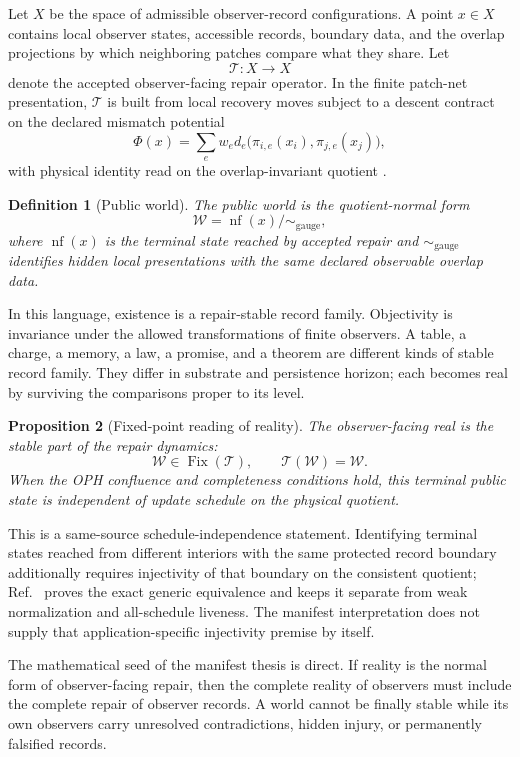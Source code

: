 \documentclass[11pt]{article}
\newtheorem{definition}{Definition}[section]
\newtheorem{proposition}[definition]{Proposition}
\theoremstyle{remark}
\theoremstyle{plain}
\newcommand{\World}{\mathcal W}
\newcommand{\Repair}{\mathcal T}
\newcommand{\NF}{\operatorname{nf}}
\newcommand{\Fix}{\operatorname{Fix}}
\begin{document}
Let \(X\) be the space of admissible observer-record configurations. A point
\(x\in X\) contains local observer states, accessible records, boundary data,
and the overlap projections by which neighboring patches compare what they
share. Let
\[
\Repair:X\to X
\]
denote the accepted observer-facing repair operator. In the finite patch-net
presentation, \(\Repair\) is built from local recovery moves subject to a
descent contract on the declared mismatch potential
\[
\Phi(x)=\sum_e w_e d_e\bigl(\pi_{i,e}(x_i),\pi_{j,e}(x_j)\bigr),
\]
with physical identity read on the overlap-invariant quotient
\cite{OPHConsensus}.

\begin{definition}[Public world]
The public world is the quotient-normal form
\[
\World=\NF(x)\big/\!\sim_{\mathrm{gauge}},
\]
where \(\NF(x)\) is the terminal state reached by accepted repair and
\(\sim_{\mathrm{gauge}}\) identifies hidden local presentations with the same
declared observable overlap data.
\end{definition}

In this language, existence is a repair-stable record family. Objectivity is
invariance under the allowed transformations of finite observers. A table, a
charge, a memory, a law, a promise, and a theorem are different kinds of stable
record family. They differ in substrate and persistence horizon; each becomes
real by surviving the comparisons proper to its level.

\begin{proposition}[Fixed-point reading of reality]
The observer-facing real is the stable part of the repair dynamics:
\[
\World\in\Fix(\Repair), \qquad \Repair(\World)=\World .
\]
When the OPH confluence and completeness conditions hold, this terminal public
state is independent of update schedule on the physical quotient.
\end{proposition}

This is a same-source schedule-independence statement.  Identifying terminal states reached from
different interiors with the same protected record boundary additionally requires injectivity of
that boundary on the consistent quotient; Ref.~\cite{observableNormalForms} proves the exact
generic equivalence and keeps it separate from weak normalization and all-schedule liveness.  The
manifest interpretation does not supply that application-specific injectivity premise by itself.

The mathematical seed of the manifest thesis is direct. If reality is the normal
form of observer-facing repair, then the complete reality of observers must
include the complete repair of observer records. A world cannot be finally
stable while its own observers carry unresolved contradictions, hidden injury,
or permanently falsified records.
\end{document}
